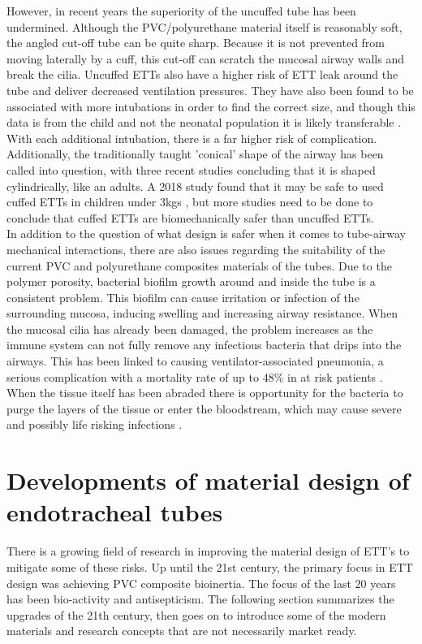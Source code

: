 \documentclass[12pt, openany, oneside]{book}
\begin{document}
However, in recent years the superiority of the uncuffed tube has been undermined. Although the PVC/polyurethane material itself is reasonably soft, the angled cut-off tube can be quite sharp. Because it is not prevented from moving laterally by a cuff, this cut-off can scratch the mucosal airway walls and break the cilia. Uncuffed ETTs also have a higher risk of  ETT leak around the tube and deliver decreased ventilation pressures. They have also been found to be associated with more intubations in order to find the correct size, and though this data is from the child and not the neonatal population it is likely transferable \citep{thomas2016cuffed}. With each additional intubation, there is a far higher risk of complication. Additionally, the traditionally taught 'conical' shape of the airway has been called into question, with three recent studies concluding that it is shaped cylindrically, like an adults. A 2018 study found that it may be safe to used cuffed ETTs in children under 3kgs \citep{thomas2018cuffed}, but more studies need to be done to conclude that cuffed ETTs are biomechanically safer than uncuffed ETTs.\\

In addition to the question of what design is safer when it comes to tube-airway mechanical interactions, there are also issues regarding the suitability of the current PVC and polyurethane composites materials of the tubes. Due to the polymer porosity, bacterial biofilm growth around and inside the tube is a consistent problem. This biofilm can cause irritation or infection of the surrounding mucosa, inducing swelling and increasing airway resistance. When the mucosal cilia has already been damaged, the problem increases as the immune system can not fully remove any infectious bacteria that drips into the airways. This has been linked to causing ventilator-associated pneumonia, a serious complication with a mortality rate of up to 48{\%} in at risk patients \citep{luo2010antimicrobial}. When the tissue itself has been abraded there is opportunity for the bacteria to purge the layers of the tissue or enter the bloodstream, which may cause severe and possibly life risking infections \citep{zur2004electron}.\\



\section{Developments of material design of endotracheal tubes}
There is a growing field of research in improving the material design of ETT's to mitigate some of these risks. Up until the 21st century, the primary focus in ETT design was achieving PVC composite bioinertia. The focus of the last 20 years has been bio-activity and antisepticism. The following section summarizes the upgrades of the 21th century, then goes on to introduce some of the modern materials and research concepts that are not necessarily market ready.
\end{document}
